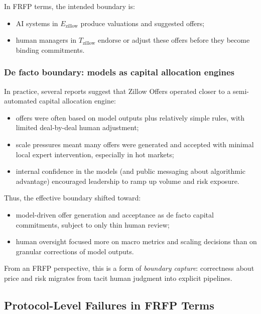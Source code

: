 In FRFP terms, the intended boundary is:

\begin{itemize}
  \item AI systems in \(E_{\mathrm{zillow}}\) produce valuations and
        suggested offers;
  \item human managers in \(T_{\mathrm{zillow}}\) endorse or adjust these
        offers before they become binding commitments.
\end{itemize}

\subsubsection*{De facto boundary: models as capital allocation engines}

In practice, several reports suggest that Zillow Offers operated closer to a
semi-automated capital allocation engine:

\begin{itemize}
  \item offers were often based on model outputs plus relatively simple
        rules, with limited deal-by-deal human adjustment;
  \item scale pressures meant many offers were generated and accepted with
        minimal local expert intervention, especially in hot markets;
  \item internal confidence in the models (and public messaging about
        algorithmic advantage) encouraged leadership to ramp up volume and
        risk exposure.
\end{itemize}

Thus, the effective boundary shifted toward:

\begin{itemize}
  \item model-driven offer generation and acceptance as de facto capital
        commitments, subject to only thin human review;
  \item human oversight focused more on macro metrics and scaling decisions
        than on granular corrections of model outputs.
\end{itemize}

From an FRFP perspective, this is a form of \emph{boundary capture}:
correctness about price and risk migrates from tacit human judgment into
explicit pipelines.

\subsection{Protocol-Level Failures in FRFP Terms}


